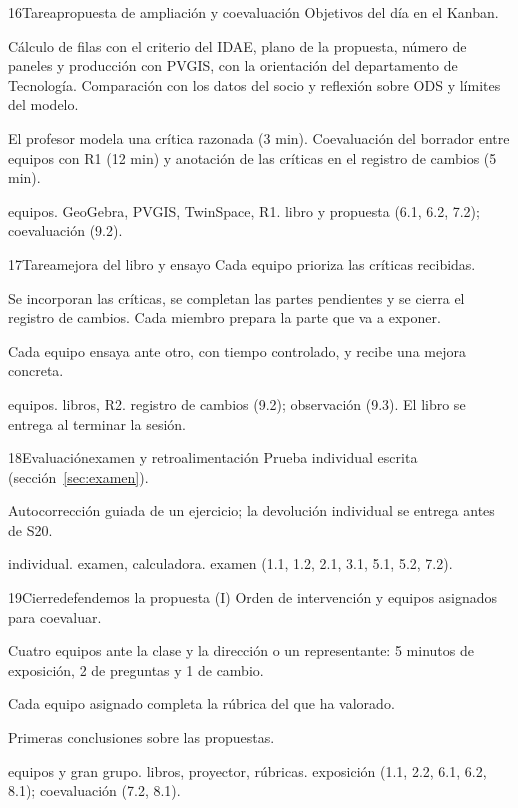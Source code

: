 \begin{sesionbox}{16}{Tarea}{propuesta de ampliación y coevaluación}
 Objetivos del día en el Kanban.

 Cálculo de filas con el criterio del IDAE, plano de la propuesta, número de paneles y producción con PVGIS, con la orientación del departamento de Tecnología. Comparación con los datos del socio y reflexión sobre ODS y límites del modelo.

 El profesor modela una crítica razonada (3 min). Coevaluación del borrador entre equipos con R1 (12 min) y anotación de las críticas en el registro de cambios (5 min).

 equipos.  GeoGebra, PVGIS, TwinSpace, R1.  libro y propuesta (6.1, 6.2, 7.2); coevaluación (9.2).
\end{sesionbox}

\begin{sesionbox}{17}{Tarea}{mejora del libro y ensayo}
 Cada equipo prioriza las críticas recibidas.

 Se incorporan las críticas, se completan las partes pendientes y se cierra el registro de cambios. Cada miembro prepara la parte que va a exponer.

 Cada equipo ensaya ante otro, con tiempo controlado, y recibe una mejora concreta.

 equipos.  libros, R2.  registro de cambios (9.2); observación (9.3). El libro se entrega al terminar la sesión.
\end{sesionbox}

\begin{sesionbox}{18}{Evaluación}{examen y retroalimentación}
 Prueba individual escrita (sección~\ref{sec:examen}).

 Autocorrección guiada de un ejercicio; la devolución individual se entrega antes de S20.

 individual.  examen, calculadora.  examen (1.1, 1.2, 2.1, 3.1, 5.1, 5.2, 7.2).
\end{sesionbox}

\begin{sesionbox}{19}{Cierre}{defendemos la propuesta (I)}
 Orden de intervención y equipos asignados para coevaluar.

 Cuatro equipos ante la clase y la dirección o un representante: 5 minutos de exposición, 2 de preguntas y 1 de cambio.

 Cada equipo asignado completa la rúbrica del que ha valorado.

 Primeras conclusiones sobre las propuestas.

 equipos y gran grupo.  libros, proyector, rúbricas.  exposición (1.1, 2.2, 6.1, 6.2, 8.1); coevaluación (7.2, 8.1).
\end{sesionbox}

